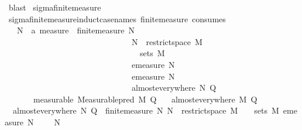 \begin{isabellebody}
\ blast\isanewline
{}\isamarkupfalse%
%
\endisatagproof
{\isafoldproof}%
%
\isadelimproof
\isanewline
%
\endisadelimproof
\isanewline
{}\isamarkupfalse%
\ sigma{\isacharunderscore}{\kern0pt}finite{\isacharunderscore}{\kern0pt}measure\isanewline
{}\ \ \ \ \ \ \ \ \ \isanewline
\isanewline
{}\isamarkupfalse%
\ sigma{\isacharunderscore}{\kern0pt}finite{\isacharunderscore}{\kern0pt}measure{\isacharunderscore}{\kern0pt}induct{\isacharbrackleft}{\kern0pt}case{\isacharunderscore}{\kern0pt}names\ finite{\isacharunderscore}{\kern0pt}measure{\isacharcomma}{\kern0pt}\ consumes\ {}{\isacharbrackright}{\kern0pt}{\isacharcolon}{\kern0pt}\isanewline
\ \ \ {\isachardoublequoteopen}{\isasymAnd}{\isacharparenleft}{\kern0pt}N\ {\isacharcolon}{\kern0pt}{\isacharcolon}{\kern0pt}\ {\isacharprime}{\kern0pt}a\ measure{\isacharparenright}{\kern0pt}\ {\isasymOmega}{\isachardot}{\kern0pt}\ finite{\isacharunderscore}{\kern0pt}measure\ N\ \isanewline
\ \ \ \ \ \ \ \ \ \ \ \ \ \ \ \ \ \ \ \ \ \ \ \ \ \ \ \ \ \ {\isasymLongrightarrow}\ N\ {\isacharequal}{\kern0pt}\ restrict{\isacharunderscore}{\kern0pt}space\ M\ {\isasymOmega}\isanewline
\ \ \ \ \ \ \ \ \ \ \ \ \ \ \ \ \ \ \ \ \ \ \ \ \ \ \ \ \ \ {\isasymLongrightarrow}\ {\isasymOmega}\ {\isasymin}\ sets\ M\ \isanewline
\ \ \ \ \ \ \ \ \ \ \ \ \ \ \ \ \ \ \ \ \ \ \ \ \ \ \ \ \ \ {\isasymLongrightarrow}\ emeasure\ N\ {\isasymOmega}\ {\isasymnoteq}\ {\isasyminfinity}\ \isanewline
\ \ \ \ \ \ \ \ \ \ \ \ \ \ \ \ \ \ \ \ \ \ \ \ \ \ \ \ \ \ {\isasymLongrightarrow}\ emeasure\ N\ {\isasymOmega}\ {\isasymnoteq}\ {}\ \isanewline
\ \ \ \ \ \ \ \ \ \ \ \ \ \ \ \ \ \ \ \ \ \ \ \ \ \ \ \ \ \ {\isasymLongrightarrow}\ almost{\isacharunderscore}{\kern0pt}everywhere\ N\ Q{\isachardoublequoteclose}\isanewline
\ \ \ \ \ \ \ {\isacharbrackleft}{\kern0pt}measurable{\isacharbrackright}{\kern0pt}{\isacharcolon}{\kern0pt}\ {\isachardoublequoteopen}Measurable{\isachardot}{\kern0pt}pred\ M\ Q{\isachardoublequoteclose}\isanewline
\ \ \ {\isachardoublequoteopen}almost{\isacharunderscore}{\kern0pt}everywhere\ M\ Q{\isachardoublequoteclose}\isanewline
%
\isadelimproof
%
\endisadelimproof
%
\isatagproof
{}\isamarkupfalse%
\ {\isacharminus}{\kern0pt}\isanewline
\ \ \isamarkupfalse%
\ {\isacharasterisk}{\kern0pt}{\isacharcolon}{\kern0pt}\ {\isachardoublequoteopen}almost{\isacharunderscore}{\kern0pt}everywhere\ N\ Q{\isachardoublequoteclose}\ \ {\isachardoublequoteopen}finite{\isacharunderscore}{\kern0pt}measure\ N{\isachardoublequoteclose}\ {\isachardoublequoteopen}N\ {\isacharequal}{\kern0pt}\ restrict{\isacharunderscore}{\kern0pt}space\ M\ {\isasymOmega}{\isachardoublequoteclose}\ {\isachardoublequoteopen}{\isasymOmega}\ {\isasymin}\ sets\ M{\isachardoublequoteclose}\ {\isachardoublequoteopen}emeasure\ N\ {\isasymOmega}\ {\isasymnoteq}\ {\isasyminfinity}{\isachardoublequoteclose}\ \ N\ {\isasymOmega}\ \isamarkupfalse%

\end{isabellebody}
